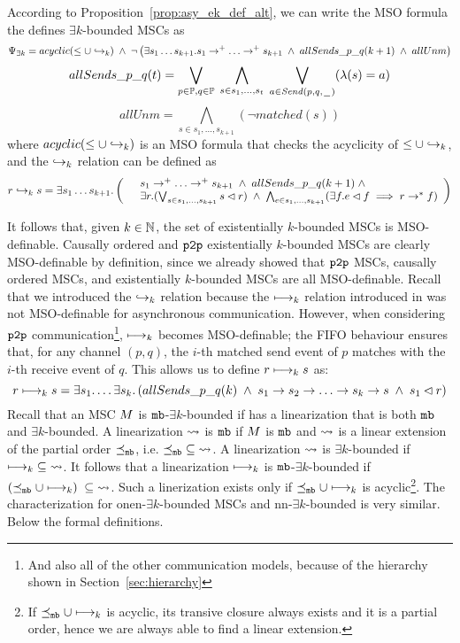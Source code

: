 \noindent According to Proposition~\ref{prop:asy_ek_def_alt}, we can write the MSO formula the defines $\exists k$-bounded MSCs as
\[
\Psi_{\exists k}=
acyclic(\le \cup \relbAsy) \;\wedge\;
\neg \left(
	\exists s_1 \dots s_{k+1}. s_1 \procrel^+ \dots \procrel^+ s_{k+1} \;\wedge \;
	allSends\_p\_q(k+1) \;\wedge\; allUnm
\right)
\]
\[
allSends\_p\_q (t) =
\bigvee_{\substack{p \in \mathbb{P}, q \in \mathbb{P}}}\;
\bigwedge_{s \in {s_1, ..., s_{t}}}\;
\bigvee_{a \in {\mathit{Send}(p,q,\hspace{0.1em}\underline{\hspace{0.5em}}\hspace{0.1em})}}
(\lambda(s) = a)
\]
\[
allUnm = \bigwedge_{s \in {s_1, ..., s_{k+1}}}(\neg \mathit{matched}(s))
\]
where $acyclic(\le \cup \hookrightarrow_{k})$ is an MSO formula that checks the acyclicity of $\le \cup \hookrightarrow_{k}$, and the $\hookrightarrow_{k}$ relation can be defined as
\[
r \relbAsy s= \exists s_1 \dots s_{k+1}. \left(
\begin{array}{rl}
	& s_1 \procrel^+ \dots \procrel^+ s_{k+1} \;\wedge\;
	allSends\_p\_q(k+1) \;\wedge\; \\
	& \exists r. (\bigvee_{s \in {s_1, ..., s_{k+1}}}s \lhd r) \;\wedge\;
	\bigwedge_{e \in {s_1, ..., s_{k+1}}}(\exists f.e \lhd f \implies r \procrel^* f) \\
\end{array}
\right)
\]

\medskip

It follows that, given $k \in \mathbb{N}$, the set of existentially $k$-bounded MSCs is MSO-definable. Causally ordered and $\mathtt{p2p}$ existentially $k$-bounded MSCs are clearly MSO-definable by definition, since we already showed that $\mathtt{p2p}$ MSCs, causally ordered MSCs, and existentially $k$-bounded MSCs are all MSO-definable. Recall that we introduced the $\hookrightarrow_{k}$ relation because the $\longmapsto_k$ relation introduced in \cite{DBLP:conf/fossacs/LohreyM02} was not MSO-definable for asynchronous communication. However, when considering $\mathtt{p2p}$ communication\footnote{And also all of the other communication models, because of the hierarchy shown in Section~\ref{sec:hierarchy}}, $\longmapsto_k$ becomes MSO-definable; the FIFO behaviour ensures that, for any channel $(p,q)$, the $i$-th matched send event of $p$ matches with the $i$-th receive event of $q$. This allows us to define $r \longmapsto_k s$ as:
\[
r \relb s=\exists s_1. \dots \exists s_k.\left(
allSends\_p\_q(k)
\;\wedge\; s_1\procrel s_2\procrel\dots
\procrel s_k\procrel s
\;\wedge\; s_1 \lhd r
\right)
\]
Recall that an MSC $M$ is $\mathtt{mb}$-$\exists k$-bounded if has a linearization that is both $\mathtt{mb}$ and $\exists k$-bounded. A linearization $\rightsquigarrow$ is $\mathtt{mb}$ if $M$ is $\mathtt{mb}$ and $\rightsquigarrow$ is a linear extension of the partial order $\preceq_{\mathtt{mb}}$, i.e. $\preceq_{\mathtt{mb}} \;\subseteq\; \rightsquigarrow$. A linearization $\rightsquigarrow$ is $\exists k$-bounded if $\longmapsto_k \;\subseteq\; \rightsquigarrow$. It follows that a linearization $\longmapsto_k$ is $\mathtt{mb}$-$\exists k$-bounded if $(\preceq_{\mathtt{mb}} \cup \longmapsto_k) \;\subseteq\; \rightsquigarrow$. Such a linerization exists only if $\preceq_{\mathtt{mb}} \cup \longmapsto_k$ is acyclic\footnote{If $\preceq_{\mathtt{mb}} \cup \longmapsto_k$ is acyclic, its transive closure always exists and it is a partial order, hence we are always able to find a linear extension.}. The characterization for onen-$\exists k$-bounded MSCs and nn-$\exists k$-bounded is very similar. Below the formal definitions.

